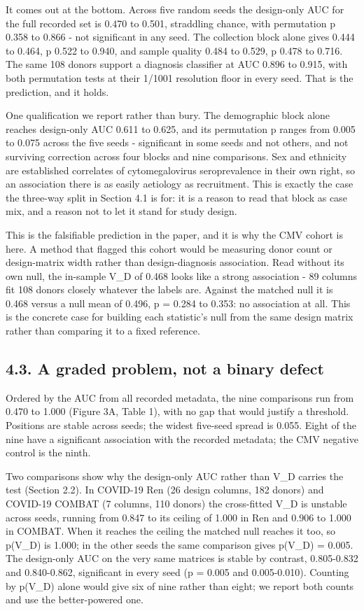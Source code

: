 It comes out at the bottom. Across five random seeds the design-only AUC for the full recorded set is 0.470 to 0.501, straddling chance, with permutation p 0.358 to 0.866 - not significant in any seed. The collection block alone gives 0.444 to 0.464, p 0.522 to 0.940, and sample quality 0.484 to 0.529, p 0.478 to 0.716. The same 108 donors support a diagnosis classifier at AUC 0.896 to 0.915, with both permutation tests at their 1/1001 resolution floor in every seed. That is the prediction, and it holds.

One qualification we report rather than bury. The demographic block alone reaches design-only AUC 0.611 to 0.625, and its permutation p ranges from 0.005 to 0.075 across the five seeds - significant in some seeds and not others, and not surviving correction across four blocks and nine comparisons. Sex and ethnicity are established correlates of cytomegalovirus seroprevalence in their own right, so an association there is as easily aetiology as recruitment. This is exactly the case the three-way split in Section 4.1 is for: it is a reason to read that block as case mix, and a reason not to let it stand for study design.

This is the falsifiable prediction in the paper, and it is why the CMV cohort is here. A method that flagged this cohort would be measuring donor count or design-matrix width rather than design-diagnosis association. Read without its own null, the in-sample V\_D of 0.468 looks like a strong association - 89 columns fit 108 donors closely whatever the labels are. Against the matched null it is 0.468 versus a null mean of 0.496, p = 0.284 to 0.353: no association at all. This is the concrete case for building each statistic's null from the same design matrix rather than comparing it to a fixed reference.

\subsection{4.3. A graded problem, not a binary defect}\label{a-graded-problem-not-a-binary-defect}

Ordered by the AUC from all recorded metadata, the nine comparisons run from 0.470 to 1.000 (Figure 3A, Table 1), with no gap that would justify a threshold. Positions are stable across seeds; the widest five-seed spread is 0.055. Eight of the nine have a significant association with the recorded metadata; the CMV negative control is the ninth.

Two comparisons show why the design-only AUC rather than V\_D carries the test (Section 2.2). In COVID-19 Ren (26 design columns, 182 donors) and COVID-19 COMBAT (7 columns, 110 donors) the cross-fitted V\_D is unstable across seeds, running from 0.847 to its ceiling of 1.000 in Ren and 0.906 to 1.000 in COMBAT. When it reaches the ceiling the matched null reaches it too, so p(V\_D) is 1.000; in the other seeds the same comparison gives p(V\_D) = 0.005. The design-only AUC on the very same matrices is stable by contrast, 0.805-0.832 and 0.840-0.862, significant in every seed (p = 0.005 and 0.005-0.010). Counting by p(V\_D) alone would give six of nine rather than eight; we report both counts and use the better-powered one.

